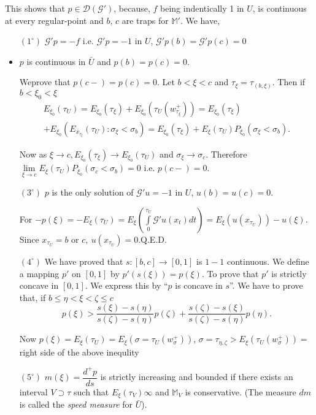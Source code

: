 This shows that $p \in \mathscr{D} (\mathscr{G}')$, because, $f$
being indentically 1 in $U$, is continuous at every regular-point
and $b$, $c$ are traps for $\mathbb{M}'$. We have, 
\begin{itemize}
\item[$(1^{\circ})$] $\mathscr{G}' p= -f$ i.e. $\mathscr{G}' p= -1$ in $U$,
  $\mathscr{G}' p(b) = \mathscr{G}' p(c) = 0$ 

\item $p$ is continuous in $\bar{U}$ and $p(b) = p(c) = 0$. 


We\pageoriginale prove that $p(c-) = p(c) =0$. 
Let $b < \xi < c$ and $\tau_\xi =
  \tau_{(b,\xi)}$. Then if $b< \xi _0 < \xi$  
\begin{multline*}
E_{\xi_0} (\tau_U ) = E_{\xi_0} (\tau_\xi ) + E_{\xi_0} (\tau_U
(w^+_{\tau _\xi})) = E_{\xi_0} (\tau_\xi)\\ 
+ E_{\xi_0} (E_{x _{\tau_{\xi}}}(\tau_U):\sigma_\xi < \sigma _b)= E_{\xi_0} (\tau_\xi)
  + E_\xi (\tau_U) P_{\xi_0} (\sigma_ \xi < \sigma_b).  
  \end{multline*}

  Now as $\xi \to c, E_{\xi_0} (\tau_\xi) \to E_{\xi_0} (\tau _U)$ and
  $\sigma_\xi \to \sigma_c$. Therefore $\lim\limits_{\xi \to c} E_\xi
  (\tau_U) P_{\xi_0} (\sigma_c < \sigma_b) = 0 $ i.e. $p(c-) = 0$. 
  

\item[$(3^{\circ})$] 
$p$ is the only solution of $\mathscr{G}' u = -1$ in $U$, $u(b) =
  u(c)=0$.  

  For $-p(\xi) = -E_\xi (\tau_U) = E_\xi (\int\limits^{\tau_{U}}_{0}
  \mathscr{G}' u(x_t) dt) = E_\xi (u (x_{\tau_{U}})) - u (\xi)$. Since
  $x _{\tau_{U}} = b $ or $c, ~ u(x_{\tau_{U}}) =  0$.\hfill Q.E.D. 

\item[$(4^{\circ})$] We have proved that $s: [b, c] \to [0, 1]$ is $1-1$
  continuous. We define a mapping $p'$ on $[0, 1]$ by $p'(s (\xi)) =
  p(\xi)$. To prove that $p'$ is strictly concave in $[0, 1]$. We
  express this by ``$p$ is concave in $s$''. We have to prove that, if
  $b \leq \eta < \xi < \zeta \leq c$ 
  $$
  p (\xi) > \frac{s (\xi) - s (\eta)} {s (\zeta) -s (\eta)} p(\zeta) +
  \frac{s (\zeta) -s (\xi)} {s (\zeta) - s (\eta)} p(\eta). 
  $$


  Now $p (\xi) = E_\xi (\tau_U) = E_\xi (\sigma= \tau_U (w^+_\sigma))$,
  $\sigma= \tau_{\eta,\zeta} > E_ \xi (\tau_U (w^+_\sigma )) =$ right
  side of the above inequlity 

\item[$(5^\circ)$] $m (\xi) = \dfrac{d^+p}{ds}$ is
  strictly increasing and bounded if there exists an interval $V
  \supset \tau$ such that $E_\xi (\tau_V) \infty$ and $\mathbb{M}_V$
  is conservative. (The measure $dm$ is called the \textit{speed
    measure} for $\bar{U}$).  
\end{itemize}
 
